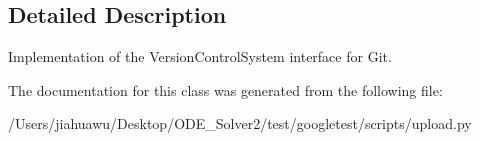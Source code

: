 \subsection{Detailed Description}
\begin{DoxyVerb}Implementation of the VersionControlSystem interface for Git.\end{DoxyVerb}
 

The documentation for this class was generated from the following file\+:\begin{DoxyCompactItemize}
\item 
/\+Users/jiahuawu/\+Desktop/\+O\+D\+E\+\_\+\+Solver2/test/googletest/scripts/upload.\+py\end{DoxyCompactItemize}
